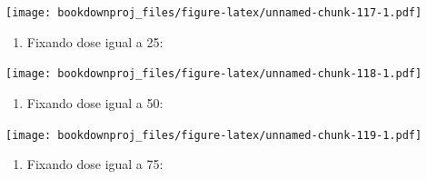 \documentclass[
]{article}
\newenvironment{Shaded}{\begin{snugshade}}{\end{snugshade}}
\newcommand{\DataTypeTok}[1]{\textcolor[rgb]{0.13,0.29,0.53}{#1}}
\newcommand{\DecValTok}[1]{\textcolor[rgb]{0.00,0.00,0.81}{#1}}
\newcommand{\KeywordTok}[1]{\textcolor[rgb]{0.13,0.29,0.53}{\textbf{#1}}}
\newcommand{\NormalTok}[1]{#1}
\newcommand{\OperatorTok}[1]{\textcolor[rgb]{0.81,0.36,0.00}{\textbf{#1}}}
\newcommand{\StringTok}[1]{\textcolor[rgb]{0.31,0.60,0.02}{#1}}
\providecommand{\tightlist}{%
  \setlength{\itemsep}{0pt}\setlength{\parskip}{0pt}}
\begin{document}
\begin{Shaded}
\end{Shaded}

\texttt{[image: bookdownproj\_files/figure-latex/unnamed-chunk-117-1.pdf]}

\begin{enumerate}
\def\labelenumi{\arabic{enumi}.}
\setcounter{enumi}{8}
\tightlist
\item
  Fixando dose igual a 25:
\end{enumerate}

\begin{Shaded}
\end{Shaded}

\texttt{[image: bookdownproj\_files/figure-latex/unnamed-chunk-118-1.pdf]}

\begin{enumerate}
\def\labelenumi{\arabic{enumi}.}
\setcounter{enumi}{9}
\tightlist
\item
  Fixando dose igual a 50:
\end{enumerate}

\begin{Shaded}
\end{Shaded}

\texttt{[image: bookdownproj\_files/figure-latex/unnamed-chunk-119-1.pdf]}

\begin{enumerate}
\def\labelenumi{\arabic{enumi}.}
\setcounter{enumi}{10}
\tightlist
\item
  Fixando dose igual a 75:
\end{enumerate}
\end{document}
